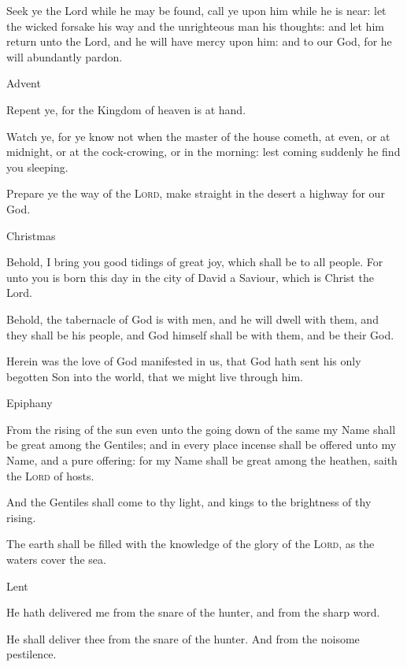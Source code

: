 \begin{multicols}{2}
    Seek ye the Lord while he may be found, call ye upon him while he is near: let the wicked forsake his way and the unrighteous man his thoughts: and let him return unto the Lord, and he will have mercy upon him: and to our God, for he will abundantly pardon.
\begin{inhead}
Advent
\end{inhead}\noindent
    Repent ye, for the Kingdom of heaven is at hand.
    \par
    Watch ye, for ye know not when the master of the house cometh, at even, or at midnight, or at the cock-crowing, or in the morning: lest coming suddenly he find you sleeping.
    \par
    Prepare ye the way of the \textsc{Lord}, make straight in the desert a highway for our God.

\begin{inhead}
Christmas
\end{inhead}\noindent
    Behold, I bring you good tidings of great joy, which shall be to all people. For unto you is born this day in the city of David a Saviour, which is Christ the Lord.
    \par
    Behold, the tabernacle of God is with men, and he will dwell with them, and they shall be his people, and God himself shall be with them, and be their God.
    \par
    Herein was the love of God manifested in us, that God hath sent his only begotten Son into the world, that we might live through him. 
    \par

\begin{inhead}
Epiphany
\end{inhead}\noindent
    From the rising of the sun even unto the going down of the same my Name shall be great among the Gentiles; and in every place incense shall be offered unto my Name, and a pure offering: for my Name shall be great among the heathen, saith the \textsc{Lord} of hosts.
    \par
    And the Gentiles shall come to thy light, and kings to the brightness of thy rising.\par
    The earth shall be filled with the knowledge of the glory of the \textsc{Lord}, as the waters cover the sea.
\begin{inhead}
Lent
\end{inhead}\noindent
    He hath delivered me from the snare of the hunter, and from the sharp word.\par
    He shall deliver thee from the snare of the hunter. And from the noisome pestilence.


\end{multicols}
